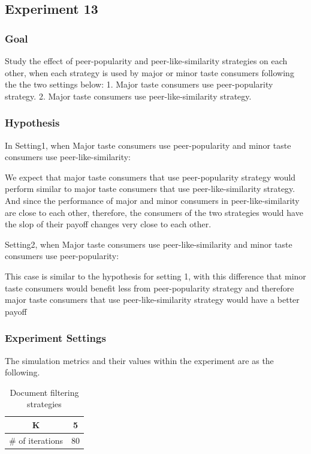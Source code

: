 \documentclass [12pt]{article} \usepackage{multicol}
\begin{document}
\subsection{Experiment 13}
\subsubsection{Goal}
Study the effect of peer-popularity and peer-like-similarity strategies on each other, 
when each strategy is used by major or minor taste consumers following the the two settings below:
 1. Major taste consumers use peer-popularity strategy. 2. Major taste consumers
use peer-like-similarity strategy.

\subsubsection{Hypothesis}


In Setting1, when Major taste consumers use peer-popularity and minor taste consumers use peer-like-similarity:
 
We expect that major taste consumers that use peer-popularity strategy would perform similar to major taste consumers that use peer-like-similarity strategy. And since the performance of 
major and minor consumers in peer-like-similarity are close to each other, therefore, the consumers of the two strategies would have the slop of their payoff changes very close to each other.  

Setting2, when Major taste consumers use peer-like-similarity and minor taste consumers use peer-popularity:

This case is similar to the hypothesis for setting 1, with this difference that minor taste consumers would benefit less from peer-popularity strategy and therefore major taste consumers
that use peer-like-similarity strategy would have a better payoff


\subsubsection{Experiment Settings}

The simulation metrics and their values within the experiment are as the following.

\begin{table}[h!]
\caption{Document filtering strategies}
\begin{center}


\begin{tabular}{|c|c|}
\hline
K   & 5 \\ \hline
\# of iterations & 80 \\ \hline
\end{tabular}


\end{center}
\label{default}
\end{table}
\end{document}
